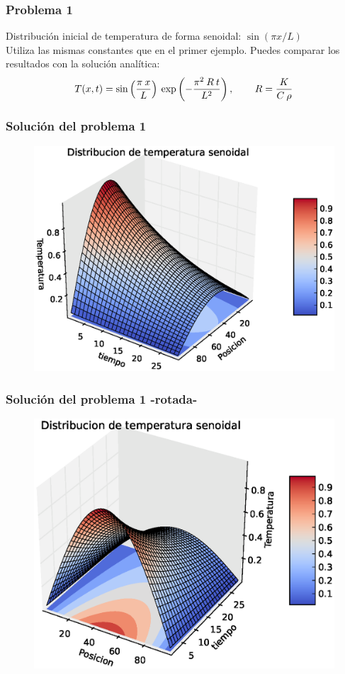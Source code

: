 \documentclass[12pt]{beamer}
\begin{document}
\begin{frame}
\frametitle{Problema 1}
Distribución inicial de temperatura de forma senoidal: $\sin( \pi x / L)$
\\
\bigskip
Utiliza las mismas constantes que en el primer ejemplo. Puedes comparar los resultados con la solución analítica:
\[ T(x,t) = \sin \left( \dfrac{\pi \: x}{L} \right) \: \exp \left(-\dfrac{\pi^{2} \: R \: t}{L^{2}} \right), \hspace{0.75cm} R=\dfrac{K}{C \: \rho} \]
\end{frame}
\begin{frame}
\frametitle{Solución del problema 1}
\begin{figure}
	\centering
	\includegraphics[scale=0.5]{Imagenes/EqCalor04.eps}  
\end{figure}
\end{frame}
\begin{frame}
\frametitle{Solución del problema 1 -rotada-}
\begin{figure}
	\centering
	\includegraphics[scale=0.5]{Imagenes/EqCalor05.eps}  
\end{figure}
\end{frame}
\end{document}
